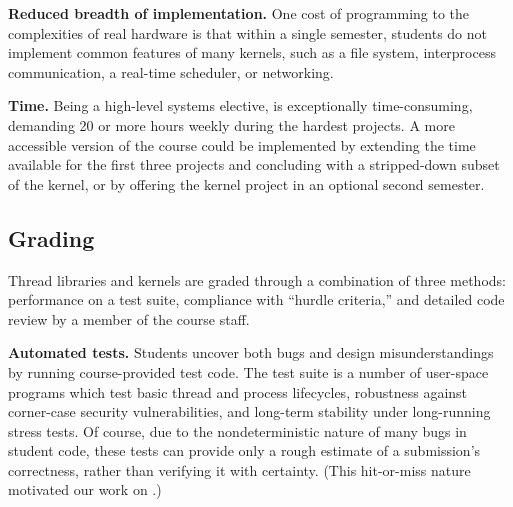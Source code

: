\textbf{Reduced breadth of implementation.}
One cost of programming to the complexities of
real hardware is that
within %
a single semester,
students do not %
implement common features of many kernels,
such as a file system, interprocess communication,
a real-time scheduler,
or networking.

\textbf{Time.}
Being a high-level systems elective, \fourten is exceptionally time-consuming,
demanding 20 or more hours weekly during the hardest projects. %
A more accessible version of the course could be implemented
by extending the time available for the first three projects
and concluding with a stripped-down subset of the kernel,
or by offering the kernel project in an optional second semester.


\subsection{Grading}
\label{sec:grading}

Thread libraries and kernels
are graded through a combination
of three methods:
performance on a test suite,
compliance with ``hurdle criteria,''
and detailed code review by a member of the course staff.

\textbf{Automated tests.}
Students uncover both bugs
and design misunderstandings by running course-provided test code.
The test suite is a number of user-space programs
which test
basic thread and process lifecycles, robustness
against corner-case security vulnerabilities, and long-term stability
under long-running stress tests.
%
%
Of course, due to the nondeterministic nature of many bugs in student code,
these tests can provide only a rough estimate of a submission's correctness,
rather than verifying it with certainty.
(This hit-or-miss nature motivated our work on \landslide.)

